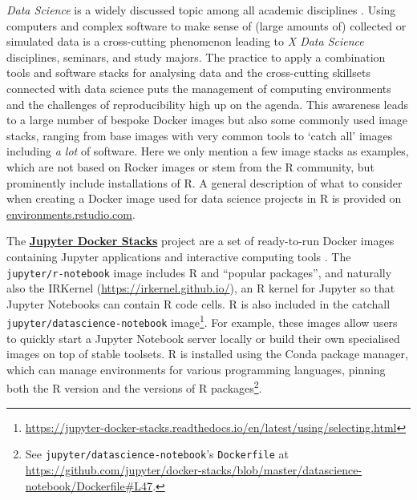 \label{datascience}

\emph{Data Science} is a widely discussed topic among all academic
disciplines \citep[cf. e.g.,][]{donoho_50_2017}. Using computers and
complex software to make sense of (large amounts of) collected or
simulated data is a cross-cutting phenomenon leading to \emph{X Data
Science} disciplines, seminars, and study majors. The practice to apply
a combination tools and software stacks for analysing data and the
cross-cutting skillsets connected with data science puts the management
of computing environments and the challenges of reproducibility high up
on the agenda. This awareness leads to a large number of bespoke Docker
images but also some commonly used image stacks, ranging from base
images with very common tools to `catch all' images including \emph{a
lot} of software. Here we only mention a few image stacks as examples,
which are not based on Rocker images or stem from the R community, but
prominently include installations of R. A general description of what to
consider when creating a Docker image used for data science projects in
R is provided on
\href{https://environments.rstudio.com/docker}{environments.rstudio.com}.

The \href{https://github.com/jupyter/docker-stacks/}{\textbf{Jupyter
Docker Stacks}} project are a set of ready-to-run Docker images
containing Jupyter applications and interactive computing tools
\citep{project_jupyter_jupyter_2018}. The \texttt{jupyter/r-notebook}
image includes R and ``popular packages'', and naturally also the
IRKernel (\url{https://irkernel.github.io/}), an R kernel for Jupyter so
that Jupyter Notebooks can contain R code cells. R is also included in
the catchall \texttt{jupyter/datascience-notebook}
image\footnote{\href{https://jupyter-docker-stacks.readthedocs.io/en/latest/using/selecting.html}{https://jupyter-docker-stacks.readthedocs.io/en/latest/using/selecting.html}}.
For example, these images allow users to quickly start a Jupyter
Notebook server locally or build their own specialised images on top of
stable toolsets. R is installed using the Conda package manager, which
can manage environments for various programming languages, pinning both
the R version and the versions of R
packages\footnote{See \texttt{jupyter/datascience-notebook}'s \texttt{Dockerfile} at \href{https://github.com/jupyter/docker-stacks/blob/master/datascience-notebook/Dockerfile\#L47}{https://github.com/jupyter/docker-stacks/blob/master/datascience-notebook/Dockerfile\#L47}.}.

